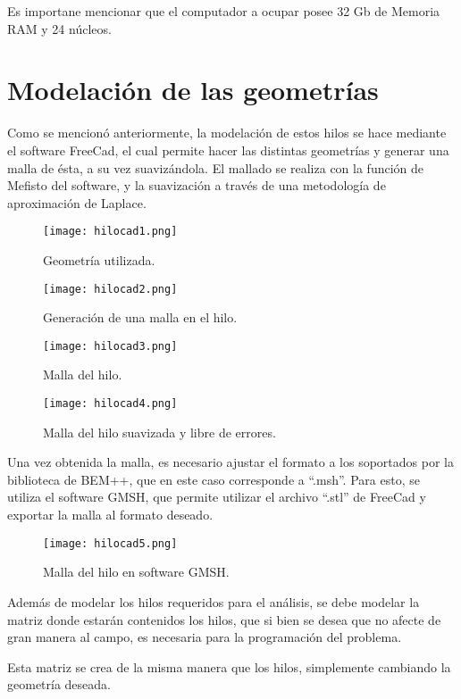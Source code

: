 \documentclass[12pt,letterpaper]{article}
\numberwithin{equation}{section}
\begin{document}
Es importane mencionar que el computador a ocupar posee 32 Gb de Memoria RAM y 24 núcleos.

\section{Modelación de las geometrías}


Como se mencionó anteriormente, la modelación de estos hilos se hace mediante el software FreeCad, el cual permite hacer las distintas geometrías y generar una malla de ésta, a su vez suavizándola. El mallado se realiza con la función de Mefisto del software, y la suavización a través de una metodología de aproximación de Laplace.

\begin{figure}[H]
	\centering\texttt{[image: hilocad1.png]}
	\caption{Geometría utilizada.}
\end{figure}

\begin{figure}[H]
	\centering\texttt{[image: hilocad2.png]}
	\caption{Generación de una malla en el hilo.}
\end{figure}

\begin{figure}[H]
	\centering\texttt{[image: hilocad3.png]}
	\caption{Malla del hilo.}
\end{figure}

\begin{figure}[H]
	\centering\texttt{[image: hilocad4.png]}
	\caption{Malla del hilo suavizada y libre de errores.}
\end{figure}

Una vez obtenida la malla, es necesario ajustar el formato a los soportados por la biblioteca de BEM++, que en este caso corresponde a ``.msh''. Para esto, se utiliza el software GMSH, que permite utilizar el archivo ``.stl'' de FreeCad y exportar la malla al formato deseado.

\begin{figure}[H]
	\centering\texttt{[image: hilocad5.png]}
	\caption{Malla del hilo en software GMSH.}
\end{figure}

Además de modelar los hilos requeridos para el análisis, se debe modelar la matriz donde estarán contenidos los hilos, que si bien se desea que no afecte de gran manera al campo, es necesaria para la programación del problema.

Esta matriz se crea de la misma manera que los hilos, simplemente cambiando la geometría deseada.
\end{document}
